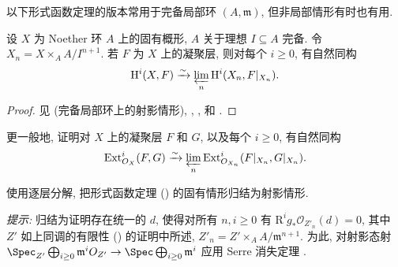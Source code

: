 以下形式函数定理的版本常用于完备局部环 $(A,\mathfrak m)$, 但非局部情形有时也有用.
\begin{theorem}[形式函数]\label{src:A.5.4}
设 $X$ 为 Noether 环 $A$ 上的固有概形, $A$ 关于理想 $I\subseteq A$ 完备. 令 $X_n=X\times_A A/I^{n+1}$. 若 $F$ 为 $X$ 上的凝聚层, 则对每个 $i\geq0$, 有自然同构
\[
\mathrm H^i(X,F)\xrightarrow{\sim}\varprojlim_n\mathrm H^i(X_n,F|_{X_n}).
\]
\end{theorem}
\begin{proof}
见 \cite[定理 III.$11.1$]{Har77} (完备局部环上的射影情形), \cite[定理 $30.8.1$]{Vak17}, \cite[推论 $8.2.4$]{Ill05}, \cite[III$_1$.$4.1.7$]{EGA} 和 \cite[Tag 02OC]{SP}.
\end{proof}
\begin{exercise}\label{src:A.5.5}
更一般地, 证明对 $X$ 上的凝聚层 $F$ 和 $G$, 以及每个 $i\geq0$, 有自然同构
\[
\operatorname{Ext}_{\mathcal O_X}^i(F,G)\xrightarrow{\sim}\varprojlim_n\operatorname{Ext}_{\mathcal O_{X_n}}^i(F|_{X_n},G|_{X_n}).
\]
\end{exercise}
\begin{exercise}\label{src:A.5.6}
使用逐层分解, 把形式函数定理 () 的固有情形归结为射影情形.

\textit{提示:} 归结为证明存在统一的 $d$, 使得对所有 $n,i\geq0$ 有 $\mathrm R^i g_*\mathcal O_{Z'_n}(d)=0$, 其中 $Z'$ 如上同调的有限性 () 的证明中所述, $Z'_n=Z'\times_A A/\mathfrak m^{n+1}$. 为此, 对射影态射 $\Spec_{Z'}\bigoplus_{i\geq0}\mathfrak m^i\mathcal O_{Z'}\to\Spec\bigoplus_{i\geq0}\mathfrak m^i$ 应用 Serre 消失定理 \cite[定理 II.$5.2$]{Har77}.
\end{exercise}
